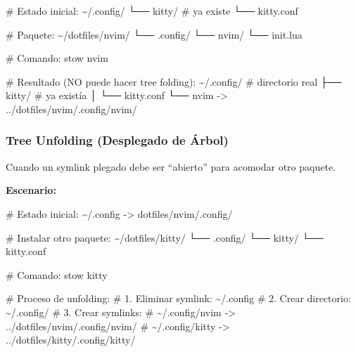 \documentclass[
  doc,
  floatsintext,
  longtable,
  a4paper,
  nolmodern,
  notxfonts,
  notimes,
  12pt,
  colorlinks=true,linkcolor=blue,citecolor=blue,urlcolor=blue]{apa7}
\newenvironment{Shaded}{\begin{snugshade}}{\end{snugshade}}
\newcommand{\AttributeTok}[1]{\textcolor[rgb]{0.40,0.45,0.13}{#1}}
\newcommand{\CommentTok}[1]{\textcolor[rgb]{0.37,0.37,0.37}{#1}}
\newcommand{\ExtensionTok}[1]{\textcolor[rgb]{0.00,0.23,0.31}{#1}}
\newcommand{\NormalTok}[1]{\textcolor[rgb]{0.00,0.23,0.31}{#1}}
\newcommand{\OperatorTok}[1]{\textcolor[rgb]{0.37,0.37,0.37}{#1}}
\begin{document}
\begin{Shaded}
\begin{Highlighting}[]
\CommentTok{\# Estado inicial:}
\ExtensionTok{\textasciitilde{}/.config/}
  \ExtensionTok{└──}\NormalTok{ kitty/        }\CommentTok{\# ya existe}
      \ExtensionTok{└──}\NormalTok{ kitty.conf}

\CommentTok{\# Paquete:}
\ExtensionTok{\textasciitilde{}/dotfiles/nvim/}
  \ExtensionTok{└──}\NormalTok{ .config/}
      \ExtensionTok{└──}\NormalTok{ nvim/}
          \ExtensionTok{└──}\NormalTok{ init.lua}

\CommentTok{\# Comando:}
\ExtensionTok{stow}\NormalTok{ nvim}

\CommentTok{\# Resultado (NO puede hacer tree folding):}
\ExtensionTok{\textasciitilde{}/.config/}              \CommentTok{\# directorio real}
  \ExtensionTok{├──}\NormalTok{ kitty/            }\CommentTok{\# ya existía}
  \ExtensionTok{│}\NormalTok{   └── kitty.conf}
  \ExtensionTok{└──}\NormalTok{ nvim }\AttributeTok{{-}}\OperatorTok{\textgreater{}}\NormalTok{ ../dotfiles/nvim/.config/nvim/}
\end{Highlighting}
\end{Shaded}

\subsubsection{Tree Unfolding (Desplegado de
Árbol)}\label{tree-unfolding-desplegado-de-uxe1rbol}

Cuando un symlink plegado debe ser ``abierto'' para acomodar otro
paquete.

\textbf{Escenario:}

\begin{Shaded}
\begin{Highlighting}[]
\CommentTok{\# Estado inicial:}
\ExtensionTok{\textasciitilde{}/.config} \AttributeTok{{-}}\OperatorTok{\textgreater{}}\NormalTok{ dotfiles/nvim/.config/}

\CommentTok{\# Instalar otro paquete:}
\ExtensionTok{\textasciitilde{}/dotfiles/kitty/}
  \ExtensionTok{└──}\NormalTok{ .config/}
      \ExtensionTok{└──}\NormalTok{ kitty/}
          \ExtensionTok{└──}\NormalTok{ kitty.conf}

\CommentTok{\# Comando:}
\ExtensionTok{stow}\NormalTok{ kitty}

\CommentTok{\# Proceso de unfolding:}
\CommentTok{\# 1. Eliminar symlink: \textasciitilde{}/.config}
\CommentTok{\# 2. Crear directorio: \textasciitilde{}/.config/}
\CommentTok{\# 3. Crear symlinks:}
\CommentTok{\#    \textasciitilde{}/.config/nvim {-}\textgreater{} ../dotfiles/nvim/.config/nvim/}
\CommentTok{\#    \textasciitilde{}/.config/kitty {-}\textgreater{} ../dotfiles/kitty/.config/kitty/}
\end{Highlighting}
\end{Shaded}
\end{document}
